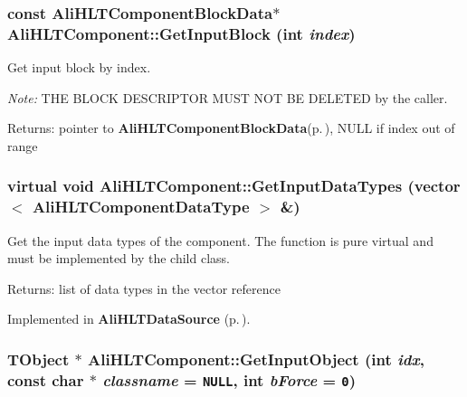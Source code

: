 \subsubsection{\setlength{\rightskip}{0pt plus 5cm}const {\bf Ali\-HLTComponent\-Block\-Data}$\ast$ Ali\-HLTComponent::Get\-Input\-Block (int {\em index})\hspace{0.3cm}{\tt  [protected]}}\label{classAliHLTComponent_b20}


Get input block by index.\par
 {\em Note:\/} THE BLOCK DESCRIPTOR MUST NOT BE DELETED by the caller. \begin{Desc}
\item[Returns:]pointer to {\bf Ali\-HLTComponent\-Block\-Data}{\rm (p.\,\pageref{structAliHLTComponentBlockData})}, NULL if index out of range \end{Desc}
\subsubsection{\setlength{\rightskip}{0pt plus 5cm}virtual void Ali\-HLTComponent::Get\-Input\-Data\-Types (vector$<$ {\bf Ali\-HLTComponent\-Data\-Type} $>$ \&)\hspace{0.3cm}{\tt  [pure virtual]}}\label{classAliHLTComponent_a10}


Get the input data types of the component. The function is pure virtual and must be implemented by the child class. \begin{Desc}
\item[Returns:]list of data types in the vector reference \end{Desc}


Implemented in {\bf Ali\-HLTData\-Source} {\rm (p.\,\pageref{classAliHLTDataSource_a4})}.
\subsubsection{\setlength{\rightskip}{0pt plus 5cm}TObject $\ast$ Ali\-HLTComponent::Get\-Input\-Object (int {\em idx}, const char $\ast$ {\em classname} = {\tt NULL}, int {\em b\-Force} = {\tt 0})\hspace{0.3cm}{\tt  [private]}}\label{classAliHLTComponent_d4}



